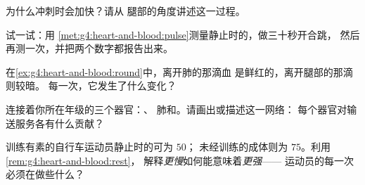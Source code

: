 \begin{exercise}[$\star$]\label{exo:g4:heart-and-blood:7}
为什么冲刺时会加快？请从
腿部的角度讲述这一过程。
\end{exercise}

\begin{exercise}[$\star$]\label{exo:g4:heart-and-blood:8}
试一试：用
\cref{met:g4:heart-and-blood:pulse}测量静止时的，做三十秒开合跳，
然后再测一次，并把两个数字都报告出来。
\end{exercise}

\begin{exercise}[$\star\star$]\label{exo:g4:heart-and-blood:9}
在\cref{ex:g4:heart-and-blood:round}中，离开肺的那滴血
是鲜红的，离开腿部的那滴则较暗。
每一次，它发生了什么变化？
\end{exercise}

\begin{exercise}[$\star\star$]\label{exo:g4:heart-and-blood:10}
连接着你所在年级的三个器官：、
肺和。请画出或描述这一网络：
每个器官对输送服务各有什么贡献？
\end{exercise}

\begin{exercise}[$\star\star\star$]\label{exo:g4:heart-and-blood:11}
训练有素的自行车运动员静止时的可为 $50$；
未经训练的成体则为 $75$。利用\cref{rem:g4:heart-and-blood:rest}，
解释\emph{更慢}如何能意味着\emph{更强}——
运动员的每一次必须在做些什么？
\end{exercise}
